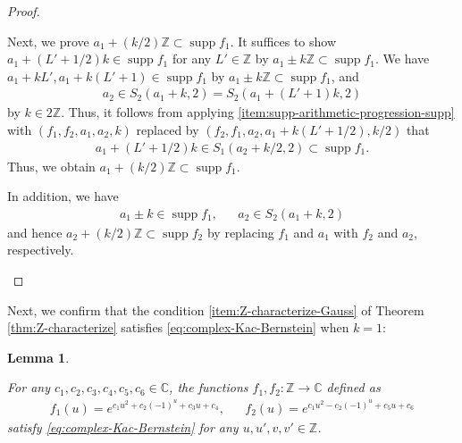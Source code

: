 \documentclass[12pt]{article}
\newtheorem{lemma}[theorem]{Lemma}
\theoremstyle{definition}
\theoremstyle{remark}
\numberwithin{equation}{section}
\numberwithin{figure}{section}
\numberwithin{table}{section}
\DeclareMathOperator{\supp}{supp}
\begin{document}
\begin{proof}
\begin{enumerate}
Next, we prove $ a_1 + ( k / 2 ) \mathbb{ Z } \subset \supp f_1 $.
It suffices to show $ a_1 + ( L' + 1 / 2 ) k \in \supp f_1 $ for any $ L' \in \mathbb{ Z } $ by $ a_1 \pm k \mathbb{ Z } \subset \supp f_1 $.
We have $ a_1 + k L' , a_1 + k ( L' + 1 ) \in \supp f_1 $ by $ a_1 \pm k \mathbb{ Z } \subset \supp f_1 $, and 
\begin{align}
    a_2 \in S_2 ( a_1 + k , 2 ) = S_2 ( a_1 + ( L' + 1 ) k , 2 )
\end{align}
by $ k \in 2 \mathbb{ Z } $.
Thus, it follows from applying \ref{item:supp-arithmetic-progression-supp} with $ (f_1 , f_2 , a_1 , a_2 , k) $ replaced by
$ (f_2 , f_1 , a_2 , a_1 + k ( L' + 1 / 2 ) , k / 2 ) $ that
\begin{align}
    a_1 + ( L' + 1 / 2 ) k \in S_1 ( a_2 + k / 2 , 2 ) \subset \supp f_1.
\end{align}
Thus, we obtain $ a_1 + ( k / 2 ) \mathbb{ Z } \subset \supp f_1 $.

In addition, we have
\begin{align}
    a_1 \pm k \in \supp f_1, & & a_2 \in S_2 ( a_1 + k , 2 )
\end{align}
and hence $ a_2 + ( k / 2 ) \mathbb{ Z } \subset \supp f_2 $ by replacing $ f_1 $ and $ a_1 $ with $ f_2 $ and $ a_2 $, respectively.
\qedhere

\end{enumerate}
    
\end{proof}

Next, we confirm that the condition \ref{item:Z-characterize-Gauss} of Theorem \ref{thm:Z-characterize} satisfies \eqref{eq:complex-Kac-Bernstein} when $ k = 1 $:

\begin{lemma}
    \label{lem:Gauss-Kac-Bernstein-observe}

For any $ c_1 , c_2 , c_3 , c_4 , c_5 , c_6 \in \mathbb{ C } $, the functions $ f_1 , f_2 \colon \mathbb{ Z } \to \mathbb{ C } $ defined as
\begin{align}
  f_1 ( u )
  = e^{ c_1 u^2 + c_2 ( - 1 )^u + c_3 u + c_4 }, & &
  f_2 ( u )
  = e^{ c_1 u^2 - c_2 ( - 1 )^u + c_5 u + c_6 } \label{eq:supp-all-Gauss-represent}
\end{align}
satisfy \eqref{eq:complex-Kac-Bernstein} for any $ u , u' , v , v' \in \mathbb{ Z } $.

\end{lemma}
\end{document}
